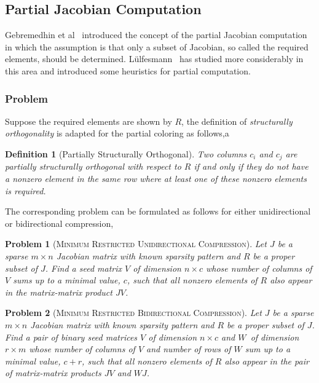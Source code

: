 \documentclass[12pt, twoside]{book}
\newtheorem{problem}{Problem}
\newtheorem{definition}{Definition}
\newcommand{\col}{\ensuremath{c}}
\newcommand{\row}{\ensuremath{r}}
\newcommand{\MinStaBic}{\textsc{Minimum Star Bicoloring}}
\newcommand{\MinBidCom}{\textsc{Minimum Bidirectional Compression}}
\newcommand{\MinRUniCom}{\textsc{Minimum Restricted Unidirectional Compression}}
\newcommand{\MinRBidCom}{\textsc{Minimum Restricted Bidirectional Compression}}
\begin{document}
\subsection{Partial Jacobian Computation}
\label{s.part.jac}
Gebremedhin et al~\cite{Gebremedhin05whatcolor} introduced the concept of the partial Jacobian computation
in which the assumption is that only a subset of Jacobian, so called the required elements,
should be determined.
L{\"u}lfesmann~\cite{Lulfesmann2012Fap} has studied more considerably in this area and
introduced some heuristics for partial computation.
\subsubsection{Problem}
\label{ss.problem.part}
Suppose the required elements are shown by $R$, the definition of
\emph{structurally orthogonality} is adapted for the partial coloring as follows,a
\begin{definition}[Partially Structurally Orthogonal]\label{d.part.str.orth}
Two columns $c_i$ and $c_j$ are partially structurally orthogonal with respect to $R$
if and only if they do not have a nonzero element in the same row where at least
one of these nonzero elements is required.
\end{definition}

The corresponding problem can be formulated as follows for either unidirectional
or bidirectional compression,
\begin{problem}[\MinRUniCom]
\label{p.seed.runi} Let $J$ be a sparse ${m\times n}$ Jacobian matrix with known sparsity
pattern and $R$ be a proper subset of $J$. Find a seed matrix $V$ of dimension $n\times \col$
whose number of columns of $V$ sums up
to a minimal value, $\col$, such that all nonzero elements of $R$ also appear in
the matrix-matrix product $JV$.
\end{problem}

\begin{problem}[\MinRBidCom]
\label{p.seed.rbid} Let $J$ be a sparse ${m\times n}$ Jacobian matrix with known sparsity
pattern and $R$ be a proper subset of $J$.
Find a pair of binary seed matrices $V$ of dimension $n\times \col$ and $W$~of
dimension $\row \times m$ whose number of columns of $V$ and number of rows of $W$ sum up
to a minimal value, $\col + \row$, such that all nonzero elements of $R$ also appear in
the pair of matrix-matrix products $JV$ and $WJ$.
\end{problem}
\end{document}
